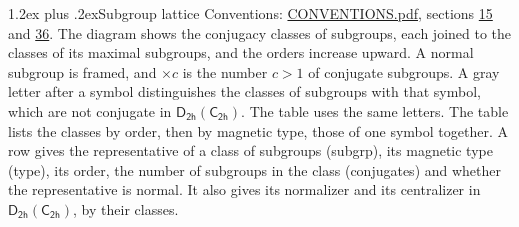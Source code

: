 \documentclass[10pt,a4paper]{article}
\makeatletter
\renewcommand\section{\@startsection{section}{1}{\z@}{-3ex plus -1ex minus -.2ex}%
  {1.2ex plus .2ex}{\normalfont\large\sffamily\bfseries\color{parttitle}}}
\numberwithin{equation}{section}
\newcommand{\grp}[1]{\mathsf{#1}}
\makeatother
\begin{document}
\section{Subgroup lattice}\label{s:subgroups}
Conventions: \href{../../CONVENTIONS.pdf}{CONVENTIONS.pdf}, sections \href{../../../rotation/CONVENTIONS.pdf\#conv.15}{15} and \href{../../CONVENTIONS.pdf\#conv.36}{36}.
The diagram shows the conjugacy classes of subgroups, each joined to the classes of its maximal subgroups, and the orders increase upward. \label{n:index.conjugates.c}A normal subgroup is framed, and ${\times}c$ is the number $c > 1$ of conjugate subgroups. \label{n:mark.letter}A gray letter after a symbol distinguishes the classes of subgroups with that symbol, which are not conjugate in $\grp{D_{2h}}(\grp{C_{2h}})$. The table uses the same letters. The table lists the classes by order, then by magnetic type, those of one symbol together. \label{n:head.subgroup}\label{n:head.magnetic.type}\label{n:head.order}\label{n:head.conjugates}\label{n:head.normal}A row gives the representative of a class of subgroups (subgrp), its magnetic type (type), its order, the number of subgroups in the class (conjugates) and whether the representative is normal. \label{n:head.normalizer}\label{n:head.centralizer}It also gives its normalizer and its centralizer in $\grp{D_{2h}}(\grp{C_{2h}})$, by their classes. 
\end{document}
